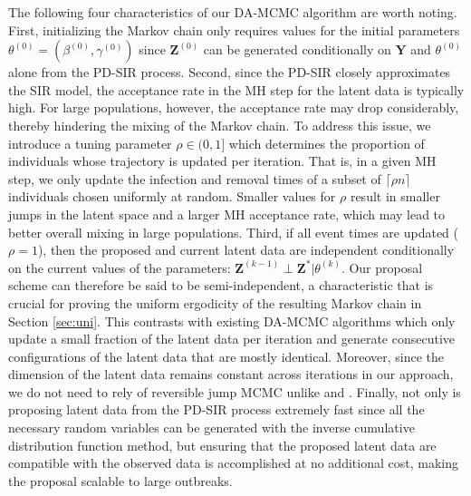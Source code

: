 \documentclass[12pt]{article}
\begin{document}
	The following four characteristics of our DA-MCMC algorithm are worth noting.
	First, initializing the Markov chain only requires values for the initial parameters $\theta^{(0)} = (\beta^{(0)}, \gamma^{(0)})$ since $\mathbf{Z}^{(0)}$ can be generated conditionally on $\mathbf{Y}$ and $\theta^{(0)}$ alone from the PD-SIR process.
	Second, since the PD-SIR closely approximates the SIR model, the acceptance rate in the MH step for the latent data is typically high. For large populations, however, the acceptance rate may drop considerably, thereby hindering the mixing of the Markov chain. To address this issue, we introduce a tuning parameter $\rho \in (0, 1]$ which determines the proportion of individuals whose trajectory is updated per iteration. That is, in a given MH step, we only update the infection and removal times of a subset of $\lceil\rho n\rceil$ individuals chosen uniformly at random.
	Smaller values for $\rho$ result in smaller jumps in the latent space and a larger MH acceptance rate, which may lead to better overall mixing in large populations.
	Third, if all event times are updated ($\rho = 1$), then the proposed and current latent data are independent conditionally on the current values of the parameters: $\mathbf{Z}^{(k-1)} \perp \mathbf{Z}^* | \theta^{(k)}$. Our proposal scheme can therefore be said to be semi-independent, a characteristic that is crucial for proving the uniform ergodicity of the resulting Markov chain in Section \ref{sec:uni}. This contrasts with existing DA-MCMC algorithms which only update a small fraction of the latent data per iteration and generate consecutive configurations of the latent data that are mostly identical. 
	Moreover, since the dimension of the latent data remains constant across iterations in our approach, we do not need to rely of reversible jump MCMC unlike \cite{Gibson.1998} and \cite{ONeill.1999}.
	Finally, not only is proposing latent data from the PD-SIR process extremely fast since all the necessary random variables can be generated with the inverse cumulative distribution function method, but ensuring that the proposed latent data are compatible with the observed data is accomplished at no additional cost, making the proposal scalable to large outbreaks.
	
\end{document}
